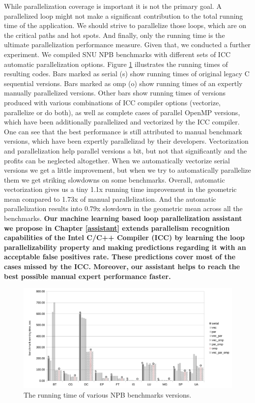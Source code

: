 \quad While parallelization coverage is important it is not the primary goal. A parallelized loop might not make a significant contribution to the total running time of the application. We should strive to parallelize those loops, which are on the critical paths and hot spots. And finally, only the running time is the ultimate parallelization performance measure. Given that, we conducted a further experiment. We compiled SNU NPB benchmarks with different sets of ICC automatic parallelization options. Figure \ref{fig:benchmarks_runtime} illustrates the running times of resulting codes. Bars marked as serial (s) show running times of original legacy C sequential versions. Bars marked as omp (o) show running times of an expertly manually parallelized versions. Other bars show running times of versions produced with various combinations of ICC compiler options (vectorize, parallelize or do both), as well as complete cases of parallel OpenMP versions, which have been additionally parallelized and vectorized by the ICC compiler. One can see that the best performance is still attributed to manual benchmark versions, which have been expertly parallelizad by their developers. Vectorization and parallelization help parallel versions a bit, but not that significantly and the profits can be neglected altogether. When we automatically vectorize serial versions we get a little improvement, but when we try to automatically parallelize them we get striking slowdowns on some benchmarks. Overall, automatic vectorization gives us a tiny 1.1x running time improvement in the geometric mean compared to 1.73x of manual parallelization. And the automatic parallelization results into 0.79x slowdown in the geometric mean across all the benchmarks.\newline\null
\textbf{\quad Our machine learning based loop parallelization assistant \cite{assistant-aiseps} we propose in Chapter \ref{assistant} extends parallelism recognition capabilities of the Intel C/C++ Compiler (ICC) by learning the loop parallelizability property and making predictions regarding it with an acceptable false positives rate. These predictions cover most of the cases missed by the ICC. Moreover, our assistant helps to reach the best possible manual expert performance faster.}
\begin{figure}[ht]
\includegraphics[width=1.0\textwidth]{images/benchmark_runtime.pdf}
\caption{The running time of various NPB benchmarks versions.}
\label{fig:benchmarks_runtime}
\end{figure}

